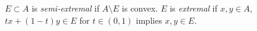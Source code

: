 $E\subset A$ is \emph{semi-extremal} if $A\setminus E$ is convex. $E$ is \emph{extremal} if $x,y\in A$, $tx+(1-t)y\in E$ for $t\in(0,1)$ implies $x,y\in E$.

